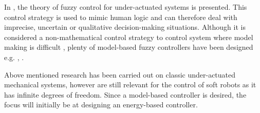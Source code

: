 In \cite{liu2013survey}, the theory of fuzzy control for under-actuated systems is presented. This control strategy is used to mimic human logic and can therefore deal with imprecise, uncertain or qualitative decision-making situations. Although it is considered a non-mathematical control strategy to control system where model making is difficult \cite{michels2007fuzzy}, plenty of model-based fuzzy controllers have been designed e.g. \cite{begovich2002takagi}, \cite{tao2008design}. 


Above mentioned research has been carried out on classic under-actuated mechanical systems, however are still relevant for the control of soft robots as it has infinite degrees of freedom. Since a model-based controller is desired, the focus will initially be at designing an energy-based controller. 





